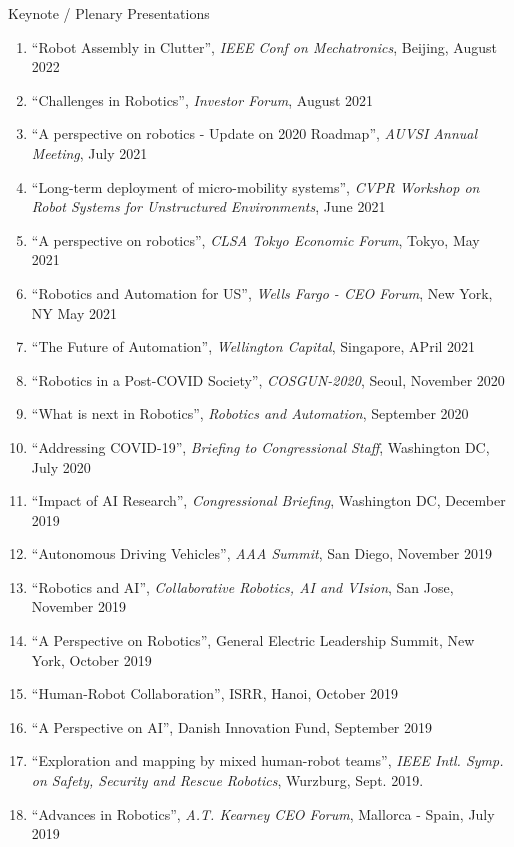 \documentclass{article}
\begin{document}
\begin{cv}
\begin{cvlist}{Keynote / Plenary Presentations}
\item
  \begin{enumerate}
  \item ``Robot Assembly in Clutter'', {\em IEEE Conf on Mechatronics}, Beijing, August 2022
  \item ``Challenges in Robotics'', {\em Investor Forum}, August 2021
  \item ``A perspective on robotics - Update on 2020 Roadmap'', {\em
    AUVSI Annual Meeting}, July 2021
  \item ``Long-term deployment of micro-mobility systems'', {\em CVPR
      Workshop on Robot Systems for Unstructured Environments}, June
    2021
  \item ``A perspective on robotics'', {\em CLSA Tokyo Economic Forum}, Tokyo, May 2021
  \item ``Robotics and Automation for US'', {\em Wells Fargo - CEO Forum}, New York, NY May 2021
  \item ``The Future of Automation'', {\em Wellington Capital}, Singapore, APril 2021
  \item ``Robotics in a Post-COVID Society'', {\em COSGUN-2020}, Seoul, November 2020
  \item ``What is next in Robotics'', {\em Robotics and Automation}, September 2020
  \item ``Addressing COVID-19'', {\em Briefing to Congressional Staff}, Washington DC, July 2020
  \item ``Impact of AI Research'', {\em Congressional Briefing}, Washington DC, December 2019
  \item ``Autonomous Driving Vehicles'', {\em AAA Summit}, San Diego, November 2019
  \item ``Robotics and AI'', {\em Collaborative Robotics, AI and VIsion}, San Jose, November 2019
  \item ``A Perspective on Robotics'', General Electric Leadership Summit, New York, October 2019
  \item ``Human-Robot Collaboration'', ISRR, Hanoi, October 2019
  \item ``A Perspective on AI'', Danish Innovation Fund, September 2019
  \item ``Exploration and mapping by mixed human-robot teams'', {\em
    IEEE Intl. Symp. on Safety, Security and Rescue Robotics},
    Wurzburg, Sept. 2019.
  \item  ``Advances in Robotics'', {\em A.T. Kearney CEO Forum}, Mallorca - Spain, July 2019

\end{enumerate}
\end{cvlist}
\end{cv}
\end{document}
